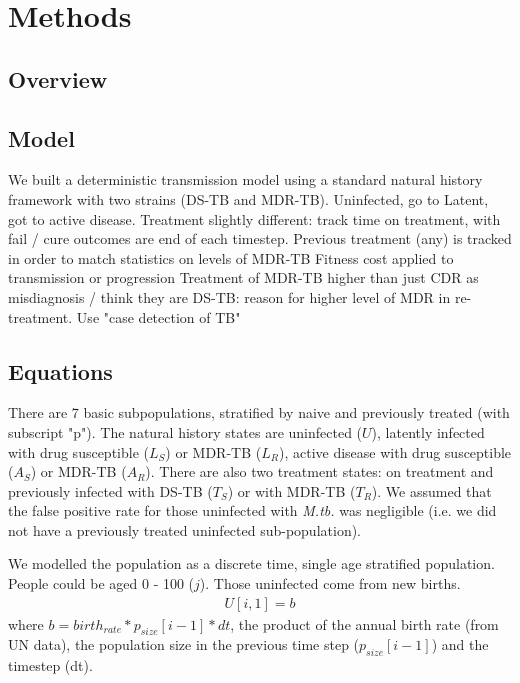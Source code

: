 \documentclass{article}
\begin{document}
\clearpage

\section{Methods}

\subsection{Overview}

\subsection{Model}

We built a deterministic transmission model using a standard natural history framework with two strains (DS-TB and MDR-TB). 
Uninfected, go to Latent, got to active disease. 
Treatment slightly different: track time on treatment, with fail / cure outcomes are end of each timestep. 
Previous treatment (any) is tracked in order to match statistics on levels of MDR-TB
Fitness cost applied to transmission or progression
Treatment of MDR-TB higher than just CDR as misdiagnosis / think they are DS-TB: reason for higher level of MDR in re-treatment. Use "case detection of TB" 

\subsection{Equations}

There are 7 basic subpopulations, stratified by naive and previously treated (with subscript "p"). The natural history states are uninfected ($U$), latently infected with drug susceptible ($L_S$) or MDR-TB ($L_R$), active disease with drug susceptible ($A_S$) or MDR-TB ($A_R$). There are also two treatment states: on treatment and previously infected with DS-TB ($T_S$) or with MDR-TB ($T_R$). We assumed that the false positive rate for those uninfected with \textit{M.tb.} was negligible (i.e. we did not have a previously treated uninfected sub-population).  

We modelled the population as a discrete time, single age stratified population. People could be aged 0 - 100 ($j$). Those uninfected come from new births. 
\begin{align}
U[i,1] = b 
\end{align}
where $b = birth_{rate} * p_{size}[i-1] * dt$, the product of the annual birth rate (from UN data), the population size in the previous time step ($p_{size}[i-1]$) and the timestep (dt). 
\end{document}

